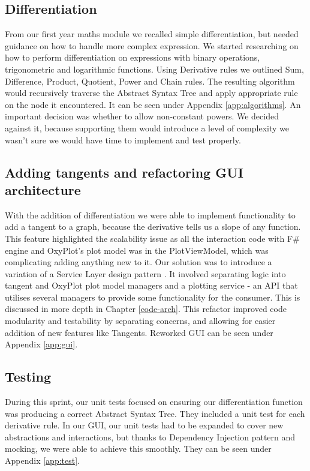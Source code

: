 \documentclass[a4paper, oneside, 11pt]{report}
\begin{document}
\subsection{Differentiation}
From our first year maths module we recalled simple differentiation, but needed guidance on how to handle more complex expression. We started researching on how to perform differentiation on expressions with binary operations, trigonometric and logarithmic functions. Using Derivative rules\cite{Derivatives} we outlined Sum, Difference, Product, Quotient, Power and Chain rules. The resulting algorithm would recursively traverse the Abstract Syntax Tree and apply appropriate rule on the node it encountered. It can be seen under Appendix \ref{app:algorithms}. An important decision was whether to allow non-constant powers. We decided against it, because supporting them would introduce a level of complexity we wasn't sure we would have time to implement and test properly.

\subsection{Adding tangents and refactoring GUI architecture}
With the addition of differentiation we were able to implement functionality to add a tangent to a graph, because the derivative tells us a slope of any function. This feature highlighted the scalability issue as all the interaction code with F\# engine and OxyPlot's plot model was in the PlotViewModel, which was complicating adding anything new to it. Our solution was to introduce a variation of a Service Layer design pattern \cite{ServiceLayer:Wiki}. It involved separating logic into tangent and OxyPlot plot model managers and a plotting service - an API that utilises several managers to provide some functionality for the consumer. This is discussed in more depth in Chapter \ref{code-arch}. This refactor improved code modularity and testability by separating concerns, and allowing for easier addition of new features like Tangents. Reworked GUI can be seen under Appendix \ref{app:gui}.

\subsection{Testing}
During this sprint, our unit tests focused on ensuring our differentiation function was producing a correct Abstract Syntax Tree. They included a unit test for each derivative rule. In our GUI, our unit tests had to be expanded to cover new abstractions and interactions, but thanks to Dependency Injection pattern and mocking, we were able to achieve this smoothly. They can be seen under Appendix \ref{app:test}. 
\end{document}
